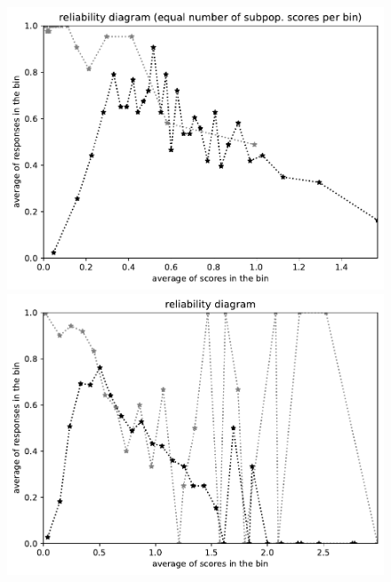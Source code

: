 \documentclass{article}
\newlength{\vertsep}
\newlength{\imsize}
\begin{document}
\begin{figure}
\begin{centering}
\parbox{\imsize}{\includegraphics[width=\imsize]
{../codes/unweighted/nll-1-248-Eskimo-dog-husky_293-cheetah-chetah-Acinonyx-jubatusequisamps30.pdf}}
\quad\quad
\parbox{\imsize}{\includegraphics[width=\imsize]
{../codes/unweighted/nll-1-248-Eskimo-dog-husky_293-cheetah-chetah-Acinonyx-jubatusequiscore30.pdf}}

\vspace{\vertsep}


\end{centering}
\end{figure}
\end{document}
